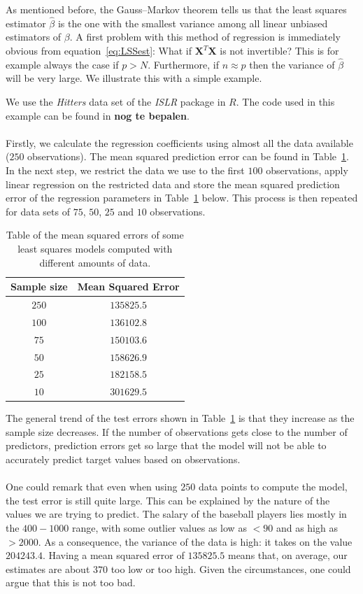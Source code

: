 As mentioned before, the Gauss--Markov theorem tells us that the least squares estimator $\hat{\beta}$ is the one with the smallest variance among all linear unbiased estimators of $\beta$. A first problem with this method of regression is immediately obvious from equation~\ref{eq:LSSest}: What if $\textbf{X}^T\textbf{X}$ is not invertible? This is for example always the case if $p > N$. Furthermore, if $n \approx p$ then the variance of $\hat{\beta}$ will be very large. We illustrate this with a simple example.
\begin{example}
We use the \textit{Hitters} data set of the \textit{ISLR} package in $R$. The code used in this example can be found in \textbf{nog te bepalen}.\\
\\
Firstly, we calculate the regression coefficients using almost all the data available ($250$ observations). The mean squared prediction error can be found in Table~\ref{tab:exampleLSS}. In the next step, we restrict the data we use to the first $100$ observations, apply linear regression on the restricted data and store the mean squared prediction error of the regression parameters in Table~\ref{tab:exampleLSS} below. This process is then repeated for data sets of $75$, $50$, $25$ and $10$ observations.
\begin{table}[ht]
    \centering
    \begin{tabular}{c|c}
         Sample size & Mean Squared Error\\
         \hline
         $250$ & $135825.5$\\
         $100$ & $136102.8$\\
         $75$ & $150103.6$\\
         $50$ & $158626.9$\\
         $25$ & $182158.5$\\
         $10$ & $301629.5$
    \end{tabular}
    \caption{Table of the mean squared errors of some least squares models computed with different amounts of data.}
    \label{tab:exampleLSS}
\end{table}
The general trend of the test errors shown in Table~\ref{tab:exampleLSS} is that they increase as the sample size decreases. If the number of observations gets close to the number of predictors, prediction errors get so large that the model will not be able to accurately predict target values based on observations.\\
\\
One could remark that even when using $250$ data points to compute the model, the test error is still quite large. This can be explained by the nature of the values we are trying to predict. The salary of the baseball players lies mostly in the $400-1000$ range, with some outlier values as low as $<90$ and as high as $>2000$. As a consequence, the variance of the data is high: it takes on the value $204243.4$. Having a mean squared error of $135825.5$ means that, on average, our estimates are about $370$ too low or too high. Given the circumstances, one could argue that this is not too bad.
\end{example}

